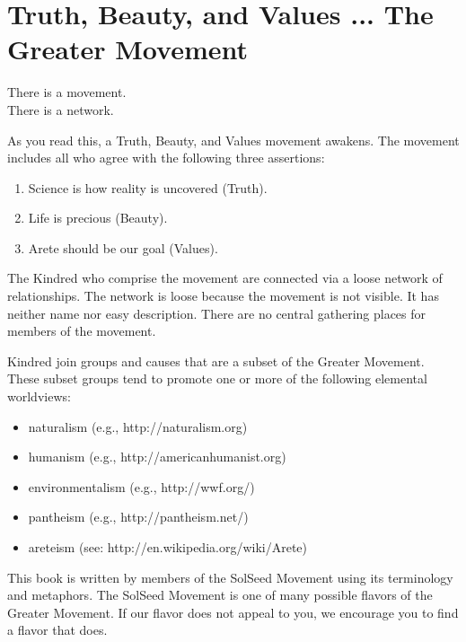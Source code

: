 \documentclass[ebook,12pt,openany,twoside]{memoir}
\newcommand{\imagefacingchapter}[1]{
  \cleartoverso
  \clearpage \null
  \thispagestyle{cleared}
  \AddToShipoutPictureBG*{%
    \AtStockLowerLeft{%
      \texttt{[image: \#1]}
    }
  }
  \clearpage
}
\begin{document}
\pagestyle{plain}

\imagefacingchapter{images/RubberBands}
\chapter{Truth, Beauty, and Values ... The Greater Movement}

\setlength\epigraphwidth{1.6in}
\epigraph{
  There is a movement.\\
  There is a network.
}{}

\noindent As you read this, a Truth, Beauty, and Values movement awakens. The
movement includes all who agree with the following three assertions:

\begin{enumerate}
  \item Science is how reality is uncovered (Truth).
  \item Life is precious (Beauty).
  \item Arete should be our goal (Values).
\end{enumerate}

The Kindred who comprise the movement are connected via a loose network of
relationships. The network is loose because the movement is not visible. It has
neither name nor easy description. There are no central gathering places for
members of the movement.

Kindred join groups and causes that are a subset of the Greater Movement. These
subset groups tend to promote one or more of the following elemental worldviews:

\begin{itemize}
  \item naturalism (e.g., http://naturalism.org)
  \item humanism (e.g., http://americanhumanist.org)
  \item environmentalism (e.g., http://wwf.org/)
  \item pantheism (e.g., http://pantheism.net/)
  \item areteism (see: http://en.wikipedia.org/wiki/Arete)
\end{itemize}

This book is written by members of the SolSeed Movement using its terminology
and metaphors. The SolSeed Movement is one of many possible flavors of the
Greater Movement. If our flavor does not appeal to you, we encourage you to
find a flavor that does.
\end{document}
